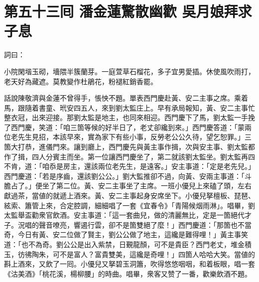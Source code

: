 
\chapter*{第五十三囘 潘金蓮驚散幽歡 吳月娘拜求子息}


詞曰：

\begin{myquote}
小院閑堦玉砌，墻隈半簇蘭芽。一庭萱草石榴花，多子宜男愛插。休使風吹雨打，老天好為藏遮。莫教變作杜鵑花，粉褪紅銷香罷。

\end{myquote}

話說陳敬濟與金蓮不曾得手，悵怏不題。單表西門慶赴黃、安二主事之席。乘着馬，跟隨着書童、玳安四五人，來到劉太監庄上。早有承局報知，黃、安二主事忙整衣冠，出來迎接。那劉太監是地主，也同來相迎。西門慶下了馬，劉太監一手挽了西門慶，笑道：「咱三箇等候的好半日了，老丈卻纔到來。」西門慶答道：「蒙兩位老先生見招，本該早來，實為家下有些小事，反勞老公公久待，望乞恕罪。」三箇大打恭，進儀門來。讓到廳上，西門慶先與黃主事作揖，次與安主事、劉太監都作了揖，四人分賓主而坐。第一位讓西門慶坐了，第二就該劉太監坐。劉太監再四不肯，道：「咱忝是房主，還該兩位老先生，是遠客。」安主事道：「定是老先兒。」西門慶道：「若是序齒，還該劉公公。」劉大監推卻不過，向黃、安兩主事道：「斗膽占了。」便坐了第二位。黃、安二主事坐了主席。一班小優兒上來磕了頭，左右獻過茶，當値的就遞上酒來。黃、安二主事起身安席坐下。小優兒拏檀板、琵琶、絃索、簫管上來，合定腔調，細細唱了一套《宜春令》「青陽候烟雨淋」。唱畢，劉太監舉盃勸衆官飲酒。安主事道：「這一套曲兒，做的清麗無比，定是一箇絕代才子。況唱的聲音嘹亮，響遏行雲，卻不是箇雙絕了麼！」西門慶道：「那箇也不當奇，今日有黃、安二位做了賢主，劉公公做了地主，這纔是難得哩！」黃主事笑道：「也不為奇。劉公公是出入紫禁，日覲龍顏，可不是貴臣？西門老丈，堆金積玉，彷彿陶朱，可不是富人？富貴雙美，這纔是奇哩！」{}四箇人哈哈大笑。當値的斟上酒來，又飲了一囘。小優兒又拏碧玉洞簫，吹得悠悠咽咽，和着板眼，唱一套《沽美酒》「桃花溪，楊柳腰」的時曲。唱畢，衆客又赞了一番，歡樂飲酒不題。

